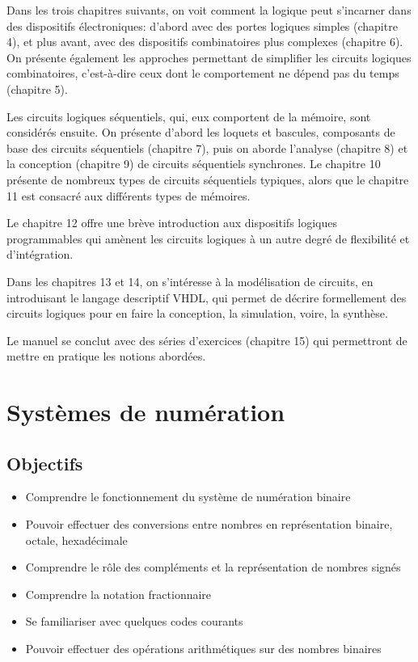 \documentclass[11pt]{article}
\begin{document}
Dans les trois chapitres suivants, on voit comment la logique peut
s'incarner dans des dispositifs électroniques: d'abord avec des portes
logiques simples (chapitre 4), et plus avant, avec des dispositifs
combinatoires plus complexes (chapitre 6). On présente également les
approches permettant de simplifier les circuits logiques
combinatoires, c'est-à-dire ceux dont le comportement ne dépend pas du
temps (chapitre 5).

Les circuits logiques séquentiels, qui, eux comportent de la
mémoire, sont considérés ensuite. On présente d'abord les loquets et
bascules, composants de base des circuits séquentiels (chapitre 7),
puis on aborde l'analyse (chapitre 8) et la conception (chapitre 9) de
circuits séquentiels synchrones. Le chapitre 10 présente de nombreux
types de circuits séquentiels typiques, alors que le chapitre 11 est
consacré aux différents types de mémoires.

Le chapitre 12 offre une brève introduction aux dispositifs logiques
programmables qui amènent les circuits logiques à un autre degré de
flexibilité et d'intégration.

Dans les chapitres 13 et 14, on s'intéresse à la modélisation de
circuits, en introduisant le langage descriptif VHDL, qui permet de
décrire formellement des circuits logiques pour en faire la
conception, la simulation, voire, la synthèse.

Le manuel se conclut avec des séries d'exercices (chapitre 15) qui
permettront de mettre en pratique les notions abordées.


\setcounter{tocdepth}{3}
\tableofcontents
\listoffigures
\listoftables
\listoflistings


\section{Systèmes de numération}
\label{sec:orgc39d15f}


\subsection{Objectifs}
\label{sec:org639d072}

\begin{itemize}
\item Comprendre le fonctionnement du système de numération binaire
\item Pouvoir effectuer des conversions entre nombres en représentation
binaire, octale, hexadécimale
\item Comprendre le rôle des compléments et la représentation de nombres signés
\item Comprendre la notation fractionnaire
\item Se familiariser avec quelques codes courants
\item Pouvoir effectuer des opérations arithmétiques sur des nombres binaires
\end{itemize}
\end{document}
